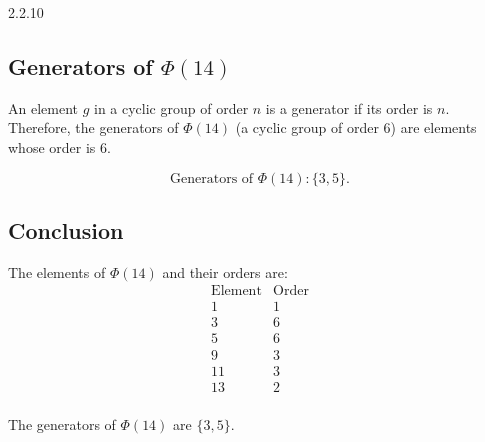 \documentclass[12pt]{amsart}
\theoremstyle{definition}
\numberwithin{equation}{section}
\begin{document}
\begin{exercise}{2.2.10}
    \subsection*{Generators of \(\Phi(14)\)}
    
    An element \(g\) in a cyclic group of order \(n\) is a generator if its order is \(n\). Therefore, the generators of \(\Phi(14)\) (a cyclic group of order 6) are elements whose order is 6.
    
    \[
    \text{Generators of } \Phi(14): \{3, 5\}.
    \]
    
    \subsection*{Conclusion}
    
    The elements of \(\Phi(14)\) and their orders are:
    \[
    \begin{array}{c|c}
    \text{Element} & \text{Order} \\
    \hline
    1 & 1 \\
    3 & 6 \\
    5 & 6 \\
    9 & 3 \\
    11 & 3 \\
    13 & 2 \\
    \end{array}
    \]
    
    The generators of \(\Phi(14)\) are \(\{3, 5\}\).
    
    \end{exercise}
    \newpage
    
\end{document}
